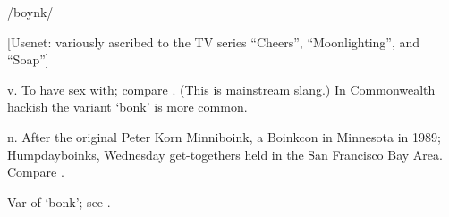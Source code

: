  /boynk/

[Usenet: variously ascribed to the TV series ``Cheers'', ``Moonlighting'', and
``Soap'']
\begin{inparaenum}
    \item v. To have sex with; compare . (This is
        mainstream slang.) In Commonwealth hackish the variant `bonk' is more
        common.
    \item n. After the original Peter Korn Minniboink, a Boinkcon in Minnesota
        in 1989; Humpdayboinks, Wednesday get-togethers held in the San
        Francisco Bay Area. Compare .
    \item Var of `bonk'; see .
\end{inparaenum}

